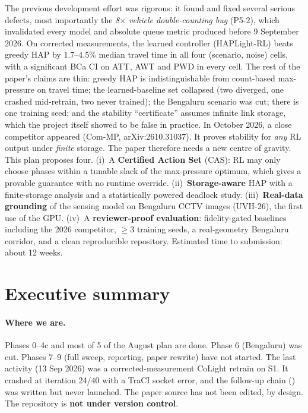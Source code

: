\documentclass[11pt,a4paper]{article}
\newcommand{\file}[1]{\texttt{\detokenize{#1}}}
\begin{document}
\begin{titlepage}
\begin{keybox}
The previous development effort was rigorous: it found and fixed several serious defects,
most importantly the \emph{8$\times$ vehicle double-counting bug} (P5-2), which invalidated
every model and absolute queue metric produced before 9 September 2026. On corrected
measurements, the learned controller (HAPLight-RL) beats greedy HAP by 1.7--4.5\% median
travel time in all four (scenario, noise) cells, with a significant BCa CI on ATT, AWT and
PWD in every cell. The rest of the paper's claims are thin: greedy HAP is
indistinguishable from count-based max-pressure on travel time; the learned-baseline set
collapsed (two diverged, one crashed mid-retrain, two never trained); the Bengaluru
scenario was cut; there is one training seed; and the stability ``certificate'' assumes
infinite link storage, which the project itself showed to be false in practice.
In October 2026, a close competitor appeared (Com-MP, arXiv:2610.31037). It proves
stability for \emph{any} RL output under \emph{finite} storage. The paper therefore needs a
new centre of gravity. This plan proposes four. (i)~A \textbf{Certified Action Set} (CAS):
RL may only choose phases within a tunable slack of the max-pressure optimum, which gives
a provable guarantee with no runtime override. (ii)~\textbf{Storage-aware} HAP with a
finite-storage analysis and a statistically powered deadlock study. (iii)~\textbf{Real-data
grounding} of the sensing model on Bengaluru CCTV images (UVH-26), the first use of the
GPU. (iv)~A \textbf{reviewer-proof evaluation}: fidelity-gated baselines including the 2026
competitor, $\ge$3 training seeds, a real-geometry Bengaluru corridor, and a clean
reproducible repository. Estimated time to submission: about 12 weeks.
\end{keybox}
\end{titlepage}

\tableofcontents
\newpage

\section{Executive summary}

\paragraph{Where we are.}
Phases 0--4c and most of 5 of the August plan are done. Phase 6 (Bengaluru) was cut.
Phases 7--9 (full sweep, reporting, paper rewrite) have not started. The last activity
(13 Sep 2026) was a corrected-measurement CoLight retrain on S1. It crashed at iteration
24/40 with a TraCI socket error, and the follow-up chain (\file{scripts/_phase5_retrain4.sh})
was written but never launched. The paper source has not been edited, by design. The
repository is \textbf{not under version control}.
\end{document}
